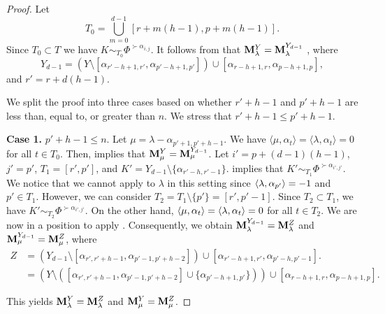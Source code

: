 \begin{proof}
    Let 
    \begin{equation}
        T_0=  \bigcup_{m = 0}^{d-1} [r + m(h - 1), p + m(h - 1)].
    \end{equation}
    Since $T_0\subset T$ we have $K\sim_{T_0} \Phi^{\succ \alpha_{i,j}}$.  
    It follows from  that $\mathbf{M}_{\lambda}^Y = \mathbf{M}_{\lambda}^{Y_{d-1}}$  , where $$Y_{d-1} = (Y\setminus [\alpha_{r'-h+1,r'},\alpha_{p'-h+1,p'}]) \cup [\alpha_{r-h+1,r},\alpha_{p-h+1,p}],$$ and $r'=r+d(h-1)$. 
    
    We split the proof into three cases based on whether $ r' + h - 1 $ and $ p' + h - 1 $ are less than, equal to, or greater than $ n $. We stress that $r'+h-1 \leq p'+h-1$. 


\bigskip
   \noindent \textbf{Case 1. }  $p'+h-1\leq n$. 
 Let $\mu = \lambda -\alpha_{{p'}+1,{p'}+h-1}$. 
 We have  $\langle  \mu , \alpha_{t} \rangle =\langle \lambda ,\alpha_{t}  \rangle =0 $ for all $t\in T_0$.
Then,  implies that   $\mathbf{M}_{\mu}^Y = \mathbf{M}_{\mu}^{Y_{d-1}} $.
Let $ i' = p + (d-1)(h-1) $, $ j' = p' $, $ T_1 = [r', p'] $, and $ K' = Y_{d-1} \setminus \{ \alpha_{r'-h, r'-1} \} $.  implies that $ K' \sim_{T_1} \Phi^{\succ \alpha_{i', j'}} $. We notice that we cannot apply  to $ \lambda $ in this setting since $ \langle \lambda , \alpha_{p'} \rangle = -1 $ and $ p' \in T_1 $. However, we can consider $ T_2 = T_1 \setminus \{ p' \} = [r', p'-1] $. Since $ T_2 \subset T_1 $, we have $ K' \sim_{T_2} \Phi^{\succ \alpha_{i', j'}} $. On the other hand, $  \langle \mu , \alpha_t \rangle =\langle \lambda , \alpha_t \rangle = 0 $ for all $ t \in T_2 $. We are now in a position to apply . Consequently, we obtain $ \mathbf{M}_{\lambda}^{Y_{d-1}} = \mathbf{M}_{\lambda}^{Z} $ and $ \mathbf{M}_{\mu}^{Y_{d-1}} = \mathbf{M}_{\mu}^{Z} $, where
\begin{equation}
    \begin{array}{rl}
        Z & = \left( Y_{d-1} \setminus  [\alpha_{r', r'+h-1}, \alpha_{p'-1, p'+h-2}]\right) \cup [\alpha_{r'-h+1, r'}, \alpha_{p'-h, p'-1}].  \\
         & = \left( Y \setminus \left( [\alpha_{r', r'+h-1}, \alpha_{p'-1, p'+h-2}] \cup \{ \alpha_{p'-h+1, p'} \} \right) \right) \cup [\alpha_{r-h+1, r}, \alpha_{p-h+1, p}].
    \end{array}
\end{equation}


This yields $ \mathbf{M}_{\lambda}^{Y} = \mathbf{M}_{\lambda}^{Z} $ and $ \mathbf{M}_{\mu}^{Y} = \mathbf{M}_{\mu}^{Z} $.


\end{proof}
